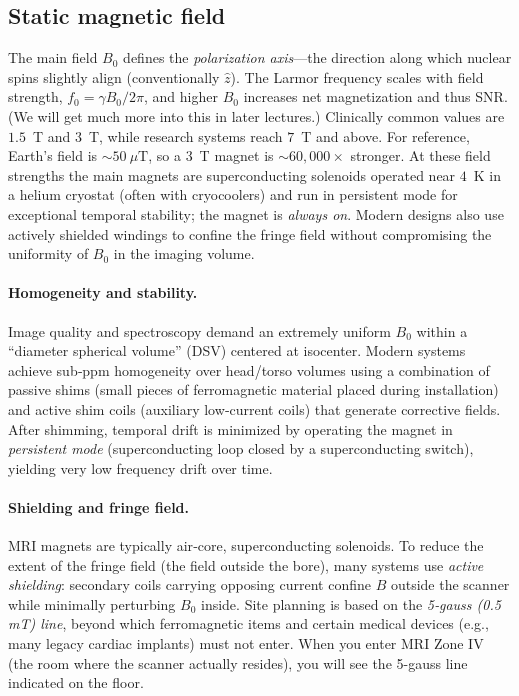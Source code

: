 \documentclass[12pt]{article}
\begin{document}
{\subsection{Static magnetic field}

The main field $B_0$ defines the \emph{polarization axis}—the direction along which nuclear spins slightly align (conventionally $\hat{z}$). The Larmor frequency scales with field strength, $f_0=\gamma B_0/2\pi$, and higher $B_0$ increases net magnetization and thus SNR. (We will get much more into this in later lectures.) Clinically common values are $1.5$~T and $3$~T, while research systems reach $7$~T and above. For reference, Earth’s field is $\sim 50~\mu\mathrm{T}$, so a $3$~T magnet is $\sim 60{,}000\times$ stronger. At these field strengths the main magnets are superconducting solenoids operated near $4$~K in a helium cryostat (often with cryocoolers) and run in persistent mode for exceptional temporal stability; the magnet is \emph{always on}. Modern designs also use actively shielded windings to confine the fringe field without compromising the uniformity of $B_0$ in the imaging volume.


\paragraph{Homogeneity and stability.}
Image quality and spectroscopy demand an extremely uniform $B_0$ within a ``diameter spherical volume'' (DSV) centered at isocenter. Modern systems achieve sub‐ppm homogeneity over head/torso volumes using a combination of passive shims (small pieces of ferromagnetic material placed during installation) and active shim coils (auxiliary low‐current coils) that generate corrective fields. After shimming, temporal drift is minimized by operating the magnet in \emph{persistent mode} (superconducting loop closed by a superconducting switch), yielding very low frequency drift over time.

\paragraph{Shielding and fringe field.}
MRI magnets are typically air‐core, superconducting solenoids. To reduce the extent of the fringe field (the field outside the bore), many systems use \emph{active shielding}: secondary coils carrying opposing current confine $B$ outside the scanner while minimally perturbing $B_0$ inside. Site planning is based on the \emph{5‐gauss (0.5 mT) line}, beyond which ferromagnetic items and certain medical devices (e.g., many legacy cardiac implants) must not enter. When you enter MRI Zone IV (the room where the scanner actually resides), you will see the 5-gauss line indicated on the floor. 

}
\end{document}
